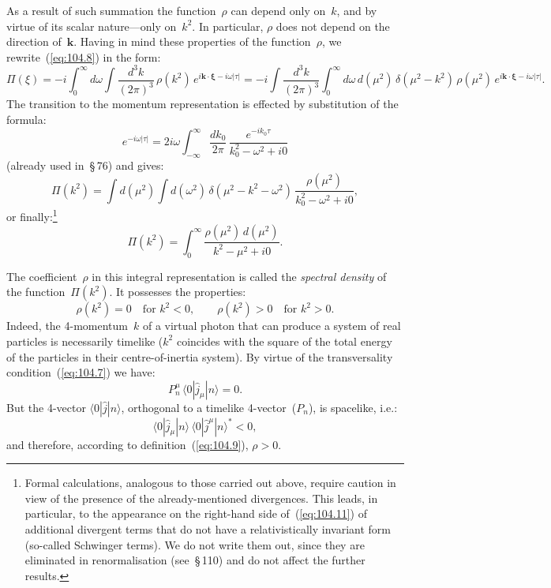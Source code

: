 As a result of such summation the function~$\rho$ can depend only on~$k$, and by virtue of its scalar nature---only on~$k^2$. In particular, $\rho$ does not depend on the direction of~$\mathbf{k}$. Having in mind these properties of the function~$\rho$, we rewrite~(\ref{eq:104.8}) in the form:
\[
\Pi(\xi) = -i\int_0^\infty d\omega \int \frac{d^3k}{(2\pi)^3}\,\rho(k^2)\,e^{i\mathbf{k}\cdot\boldsymbol{\xi} - i\omega|\tau|} = -i\int \frac{d^3k}{(2\pi)^3}\int_0^\infty d\omega\,d(\mu^2)\,\delta(\mu^2 - k^2)\,\rho(\mu^2)\,e^{i\mathbf{k}\cdot\boldsymbol{\xi} - i\omega|\tau|}.
\]
The transition to the momentum representation is effected by substitution of the formula:
\begin{equation}
e^{-i\omega|\tau|} = 2i\omega \int_{-\infty}^{\infty} \frac{dk_0}{2\pi}\,\frac{e^{-ik_0\tau}}{k_0^2 - \omega^2 + i0}
\label{eq:104.10}
\end{equation}
(already used in~\S\,76) and gives:
\[
\Pi(k^2) = \int d(\mu^2)\int d(\omega^2)\,\delta(\mu^2 - k^2 - \omega^2)\,\frac{\rho(\mu^2)}{k_0^2 - \omega^2 + i0},
\]
or finally:\footnote{Formal calculations, analogous to those carried out above, require caution in view of the presence of the already-mentioned divergences. This leads, in particular, to the appearance on the right-hand side of~(\ref{eq:104.11}) of additional divergent terms that do not have a relativistically invariant form (so-called Schwinger terms). We do not write them out, since they are eliminated in renormalisation (see~\S\,110) and do not affect the further results.}
\begin{equation}
\Pi(k^2) = \int_0^\infty \frac{\rho(\mu^2)\,d(\mu^2)}{k^2 - \mu^2 + i0}.
\label{eq:104.11}
\end{equation}


The coefficient~$\rho$ in this integral representation is called the \emph{spectral density} of the function~$\Pi(k^2)$. It possesses the properties:
\begin{equation}
\rho(k^2) = 0 \quad \text{for } k^2 < 0, \qquad \rho(k^2) > 0 \quad \text{for } k^2 > 0.
\label{eq:104.12}
\end{equation}
Indeed, the 4-momentum~$k$ of a virtual photon that can produce a system of real particles is necessarily timelike ($k^2$ coincides with the square of the total energy of the particles in their centre-of-inertia system). By virtue of the transversality condition~(\ref{eq:104.7}) we have:
\[
P_n^\mu\,\langle 0|\hat{j}_\mu|n\rangle = 0.
\]
But the 4-vector $\langle 0|\hat{j}|n\rangle$, orthogonal to a timelike 4-vector~($P_n$), is spacelike, i.e.:
\[
\langle 0|\hat{j}_\mu|n\rangle\,\langle 0|\hat{j}^\mu|n\rangle^* < 0,
\]
and therefore, according to definition~(\ref{eq:104.9}), $\rho > 0$.
